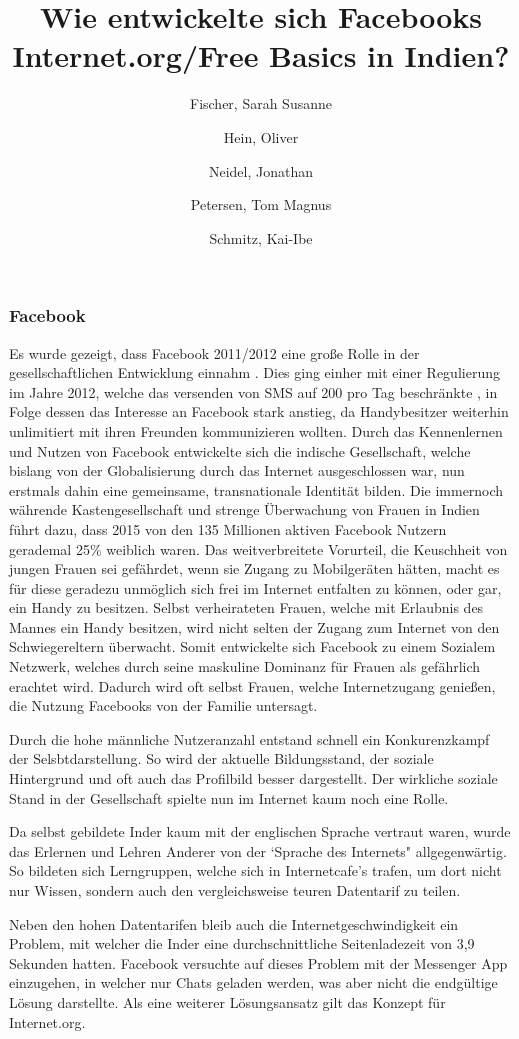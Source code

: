 \documentclass{article}
\title{Wie entwickelte sich Facebooks Internet.org/Free Basics in Indien?}
\author{
  Fischer, Sarah Susanne\\
  \and
  Hein, Oliver\\
  \and
  Neidel, Jonathan\\
  \and
  Petersen, Tom Magnus\\
  \and
  Schmitz, Kai-Ibe\\
}
\begin{document}
\maketitle

\subsubsection{Facebook}
Es wurde gezeigt, dass Facebook 2011/2012 eine große Rolle in der gesellschaftlichen Entwicklung einnahm \parencite{empowermentThroughFacebook}.
Dies ging einher mit einer Regulierung im Jahre 2012, welche das versenden von SMS auf 200 pro Tag beschränkte \autocite{PressInformation}, in Folge dessen das Interesse an Facebook stark anstieg, da Handybesitzer weiterhin unlimitiert mit ihren Freunden kommunizieren wollten.
Durch das Kennenlernen und Nutzen von Facebook entwickelte sich die indische Gesellschaft, welche bislang von der Globalisierung durch das Internet ausgeschlossen war, nun erstmals dahin eine gemeinsame, transnationale Identität bilden.
\medskip
Die immernoch währende Kastengesellschaft und strenge Überwachung von Frauen in Indien führt dazu, dass 2015 von den 135 Millionen aktiven Facebook Nutzern gerademal 25\% weiblich waren\autocite{slideshareIndia}. 
Das weitverbreitete Vorurteil, die Keuschheit von jungen Frauen sei gefährdet, wenn sie Zugang zu Mobilgeräten hätten, macht es für diese geradezu unmöglich sich frei im Internet entfalten zu können, oder gar, ein Handy zu besitzen.
Selbst verheirateten Frauen, welche mit Erlaubnis des Mannes ein Handy besitzen, wird nicht selten der Zugang zum Internet von den Schwiegereltern überwacht.
Somit entwickelte sich Facebook zu einem Sozialem Netzwerk, welches durch seine maskuline Dominanz für Frauen als gefährlich erachtet wird.
Dadurch wird oft selbst Frauen, welche Internetzugang genießen, die Nutzung Facebooks von der Familie untersagt. 


Durch die hohe männliche Nutzeranzahl entstand schnell ein Konkurenzkampf der Selsbtdarstellung.
So wird der aktuelle Bildungsstand, der soziale Hintergrund und oft auch das Profilbild besser dargestellt.
Der wirkliche soziale Stand in der Gesellschaft spielte nun im Internet kaum noch eine Rolle.

Da selbst gebildete Inder kaum mit der englischen Sprache vertraut waren, wurde das Erlernen und Lehren Anderer von der `Sprache des Internets" allgegenwärtig. %
So bildeten sich Lerngruppen, welche sich in Internetcafe's trafen, um dort nicht nur Wissen, sondern auch den vergleichsweise teuren Datentarif zu teilen.


Neben den hohen Datentarifen bleib auch die Internetgeschwindigkeit ein Problem, mit welcher die Inder eine durchschnittliche Seitenladezeit von 3,9 Sekunden hatten\autocite{mashable}. Facebook versuchte auf dieses Problem mit der Messenger App einzugehen, in welcher nur Chats geladen werden, was aber nicht die endgültige Lösung darstellte. Als eine weiterer Lösungsansatz gilt das Konzept für Internet.org.

\end{document}

